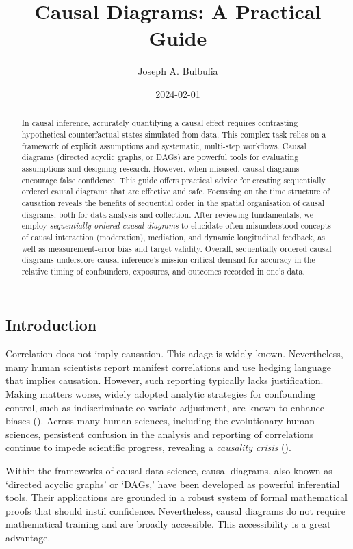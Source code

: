 \documentclass[
  singlecolumn]{article}
\title{Causal Diagrams: A Practical Guide}
\author{Joseph A. Bulbulia}
\date{2024-02-01}
\begin{document}
\maketitle
\begin{abstract}
In causal inference, accurately quantifying a causal effect requires
contrasting hypothetical counterfactual states simulated from data. This
complex task relies on a framework of explicit assumptions and
systematic, multi-step workflows. Causal diagrams (directed acyclic
graphs, or DAGs) are powerful tools for evaluating assumptions and
designing research. However, when misused, causal diagrams encourage
false confidence. This guide offers practical advice for creating
sequentially ordered causal diagrams that are effective and safe.
Focussing on the time structure of causation reveals the benefits of
sequential order in the spatial organisation of causal diagrams, both
for data analysis and collection. After reviewing fundamentals, we
employ \emph{sequentially ordered causal diagrams} to elucidate often
misunderstood concepts of causal interaction (moderation), mediation,
and dynamic longitudinal feedback, as well as measurement-error bias and
target validity. Overall, sequentially ordered causal diagrams
underscore causal inference's mission-critical demand for accuracy in
the relative timing of confounders, exposures, and outcomes recorded in
one's data.
\end{abstract}

\subsection{Introduction}\label{introduction}

Correlation does not imply causation. This adage is widely known.
Nevertheless, many human scientists report manifest correlations and use
hedging language that implies causation. However, such reporting
typically lacks justification. Making matters worse, widely adopted
analytic strategies for confounding control, such as indiscriminate
co-variate adjustment, are known to enhance biases
(). Across many human
sciences, including the evolutionary human sciences, persistent
confusion in the analysis and reporting of correlations continue to
impede scientific progress, revealing a \emph{causality crisis}
().

Within the frameworks of causal data science, causal diagrams, also
known as `directed acyclic graphs' or `DAGs,' have been developed as
powerful inferential tools. Their applications are grounded in a robust
system of formal mathematical proofs that should instil confidence.
Nevertheless, causal diagrams do not require mathematical training and
are broadly accessible. This accessibility is a great advantage.
\end{document}
